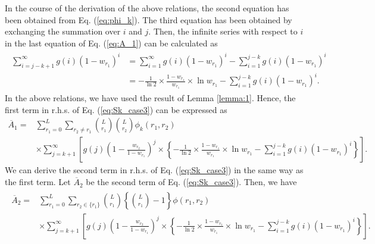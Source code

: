 In the course of the derivation of the above relations, the second equation has been obtained from Eq. (\ref{eq:phi_k}). The third equation has been obtained by exchanging the summation over $i$ and $j$.
%
Then, the infinite series with respect to $i$ in the last equation of Eq. (\ref{eq:A_1}) can be calculated as
\begin{align}\begin{split}
	\sum_{i=j-k+1}^{\infty} g(i)(1-w_{r_1})^{i} 
	&= \sum_{i=1}^{\infty} g(i)(1-w_{r_1})^{i} - \sum_{i=1}^{j-k} g(i)(1-w_{r_1})^{i} \\
	&= -\frac{1}{\ln 2} \times \frac{1-w_{r_1}}{w_{r_1}} \times \ln w_{r_1} - \sum_{i=1}^{j-k} g(i)(1-w_{r_1})^{i}.
\end{split}\end{align}
In the above relations, we have used the result of Lemma \ref{lemma:1}.
Hence, the first term in r.h.s. of Eq. (\ref{eq:Sk_case3}) can be expressed as
\begin{align}
	\overline{A}_1 
	=& \sum_{r_1=0}^{L} \sum_{r_2 \neq r_1} \binom{L}{r_1}\binom{L}{r_2}\phi_k(r_1,r_2)\\
	&\times\sum_{j=k+1}^{\infty} \left[ g(j) \left(1-\frac{w_{r_2}}{1-w_{r_1}} \right)^{j} \times \left\{ -\frac{1}{\ln 2} \times \frac{1-w_{r_1}}{w_{r_1}} \times \ln w_{r_1} - \sum_{i=1}^{j-k} g(i)(1-w_{r_1})^{i} \right\} \right].
\end{align}
We can derive the second term in r.h.s. of Eq. (\ref{eq:Sk_case3}) in the same way as the first term. Let $\overline{A}_2$ be the second term of Eq. (\ref{eq:Sk_case3}). Then, we have
\begin{align}\begin{split}
	\overline{A}_2 =& \sum_{r_1=0}^{L} \sum_{r_2 \in \{r_1\}} \binom{L}{r_1}\left\{\binom{L}{r_1}-1\right\} \phi(r_1,r_2) \\
	&\times\sum_{j=k+1}^{\infty} \left[ g(j) \left(1-\frac{w_{r_2}}{1-w_{r_1}} \right)^{j} \times \left\{ -\frac{1}{\ln 2} \times \frac{1-w_{r_1}}{w_{r_1}} \times \ln w_{r_1} - \sum_{i=1}^{j-k} g(i)(1-w_{r_1})^{i} \right\} \right].
\end{split}\end{align}

